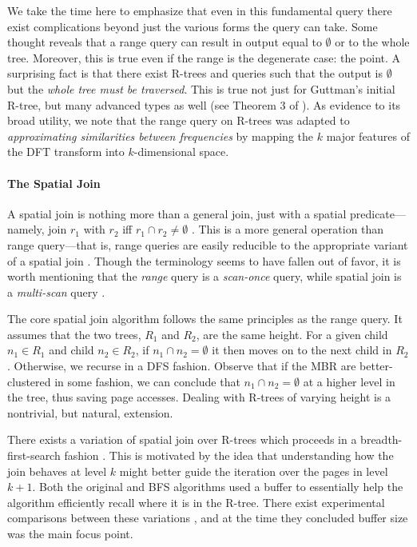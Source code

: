 We take the time here to emphasize that even in this fundamental query there exist complications beyond just the various forms the query can take.
Some thought reveals that a range query can result in output equal to $\emptyset$ or to the whole tree.
Moreover, this is true even if the range is the degenerate case: the point.
A surprising fact is that there exist R-trees and queries such that the output is $\emptyset$ but the \emph{whole tree must be traversed}.
This is true not just for Guttman's initial R-tree, but many advanced types as well (see Theorem 3 of \cite{argeberghaverkortyi04}).
As evidence to its broad utility, we note that the range query on R-trees was adapted to \emph{approximating similarities between frequencies} \cite{agrawalfaloutsosswami93} by mapping the $k$ major features of the DFT transform into $k$-dimensional space.

\paragraph{The Spatial Join}
A spatial join is nothing more than a general join, just with a spatial predicate---namely, join $r_1$ with $r_2$ iff $r_1\cap r_2\neq\emptyset$ \cite{brinkhoffkriegelseeger93}.
This is a more general operation than range query---that is, range queries are easily reducible to the appropriate variant of a spatial join \cite{gaedegunther98}.
Though the terminology seems to have fallen out of favor, it is worth mentioning that the \emph{range} query is a \emph{scan-once} query, while spatial join is a \emph{multi-scan} query \cite{brinkhoffkriegelseeger93,samet90}.

The core spatial join algorithm \cite{brinkhoffkriegelseeger93} follows the same principles as the range query.
It assumes that the two trees, $R_1$ and $R_2$, are the same height.
For a given child $n_1\in R_1$ and child $n_2\in R_2$, if $n_1\cap n_2=\emptyset$ it then moves on to the next child in $R_2$.
Otherwise, we recurse in a DFS fashion.
Observe that if the MBR are better-clustered in some fashion, we can conclude that $n_1\cap n_2=\emptyset$ at a higher level in the tree, thus saving page accesses.
Dealing with R-trees of varying height is a nontrivial, but natural, extension.

There exists a variation of spatial join over R-trees which proceeds in a breadth-first-search fashion \cite{huangjingrundensteiner97}.
This is motivated by the idea that understanding how the join behaves at level $k$ might better guide the iteration over the pages in level $k+1$.
Both the original and BFS algorithms used a buffer to essentially help the algorithm efficiently recall where it is in the R-tree.
There exist experimental comparisons between these variations \cite{papadopoulosrigauxscholl99}, and at the time they concluded buffer size was the main focus point.

